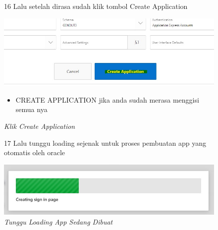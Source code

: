 \begin{itemize}
        \begin{figure}[!htbp]
        \item[16]Lalu setelah dirasa sudah klik tombol Create Application
        \begin{center}
        \includegraphics[scale=0.4]{figures/klik_tombol_create_application.jpg}
        \caption{\textit{Klik Create Application}}
        \end{center}   
        \begin{itemize}
            \item CREATE APPLICATION jika anda sudah merasa menggisi semua nya 
        \end{itemize}
        \end{figure}
        
        \begin{figure}[!htbp]
        \item[17]Lalu tunggu loading sejenak untuk proses pembuatan app yang otomatis oleh oracle
        \begin{center}
        \includegraphics[scale=0.4]{figures/tunggu_loading_app_sdg_dibuat.jpg}
        \caption{\textit{Tunggu Loading App Sedang Dibuat}}
        \end{center}
        \end{figure}
        

\end{itemize}

